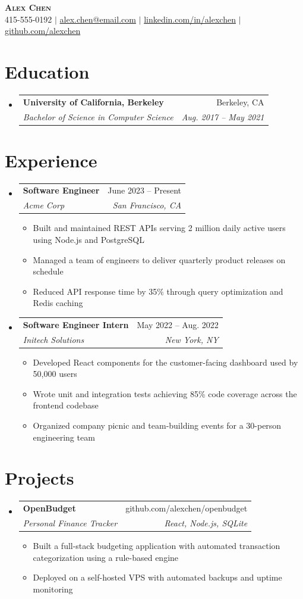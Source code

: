 \documentclass[letterpaper,11pt]{article}
\makeatletter
\newcommand{\resumeItem}[1]{
  \item\small{
    {#1 \vspace{-2pt}}
  }
}
\newcommand{\resumeSubheading}[4]{
  \vspace{-2pt}\item
    \begin{tabular*}{0.97\textwidth}[t]{l@{\extracolsep{\fill}}r}
      \textbf{#1} & #2 \\
      \textit{\small#3} & \textit{\small #4} \\
    \end{tabular*}\vspace{-7pt}
}
\newcommand{\resumeSubHeadingListStart}{\begin{itemize}[leftmargin=0.15in, label={}]}
\newcommand{\resumeSubHeadingListEnd}{\end{itemize}}
\newcommand{\resumeItemListStart}{\begin{itemize}}
\newcommand{\resumeItemListEnd}{\end{itemize}\vspace{-5pt}}
\makeatother
\begin{document}
\begin{center}
    \textbf{\Huge \scshape Alex Chen} \\ \vspace{1pt}
    \small 415-555-0192 $|$ \href{mailto:alex.chen@email.com}{alex.chen@email.com} $|$
    \href{https://linkedin.com/in/alexchen}{linkedin.com/in/alexchen} $|$
    \href{https://github.com/alexchen}{github.com/alexchen}
\end{center}

\section{Education}
  \resumeSubHeadingListStart
    \resumeSubheading
      {University of California, Berkeley}{Berkeley, CA}
      {Bachelor of Science in Computer Science}{Aug. 2017 -- May 2021}
  \resumeSubHeadingListEnd

\section{Experience}
  \resumeSubHeadingListStart

    \resumeSubheading
      {Software Engineer}{June 2023 -- Present}
      {Acme Corp}{San Francisco, CA}
      \resumeItemListStart
        \resumeItem{Built and maintained REST APIs serving 2 million daily active users using Node.js and PostgreSQL}
        \resumeItem{Managed a team of engineers to deliver quarterly product releases on schedule}
        \resumeItem{Reduced API response time by 35\% through query optimization and Redis caching}
      \resumeItemListEnd

    \resumeSubheading
      {Software Engineer Intern}{May 2022 -- Aug. 2022}
      {Initech Solutions}{New York, NY}
      \resumeItemListStart
        \resumeItem{Developed React components for the customer-facing dashboard used by 50,000 users}
        \resumeItem{Wrote unit and integration tests achieving 85\% code coverage across the frontend codebase}
        \resumeItem{Organized company picnic and team-building events for a 30-person engineering team}
      \resumeItemListEnd

  \resumeSubHeadingListEnd

\section{Projects}
  \resumeSubHeadingListStart
    \resumeSubheading
      {OpenBudget}{github.com/alexchen/openbudget}
      {Personal Finance Tracker}{React, Node.js, SQLite}
      \resumeItemListStart
        \resumeItem{Built a full-stack budgeting application with automated transaction categorization using a rule-based engine}
        \resumeItem{Deployed on a self-hosted VPS with automated backups and uptime monitoring}
      \resumeItemListEnd
  \resumeSubHeadingListEnd
\end{document}
